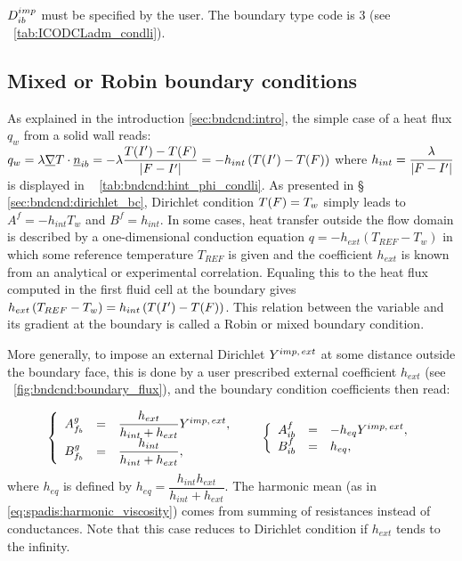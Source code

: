 \begin{remark}
$D^{imp}_{ib}$ must be specified by the user. The boundary type code is $3$ (see \tablename~\ref{tab:ICODCLadm_condli}).
\end{remark}

\subsection{Mixed or Robin boundary conditions}
As explained in the introduction \ref{sec:bndcnd:intro}, the simple case of a heat flux $q_w$ from a solid wall reads: $q_w = \lambda \underline{\nabla} T \cdot \underline{n}_{ib} = - \lambda \dfrac{T({I^\prime}) - T(F)}{\left| F - {I^\prime} \right|} = -h_{int} \left( T({I^\prime}) - T(F) \right)$ where $h_{int} = \dfrac{\lambda}{\left| F - {I^\prime} \right|}$ is displayed in \tablename~ \ref{tab:bndcnd:hint_phi_condli}.
As presented in \S~ \ref{sec:bndcnd:dirichlet_bc}, Dirichlet condition $T(F) = T_w$ simply leads to $A^f = - h_{int} T_w$ and $B^f = h_{int}$.
In some cases, heat transfer outside the flow domain is described by a one-dimensional conduction equation $q = -h_{ext} \left(T_{REF} - T_w \right)$
in which some reference temperature $T_{REF}$ is given and the coefficient $h_{ext}$ is known from an analytical or experimental correlation.
Equaling this to the heat flux computed in the first fluid cell at the boundary gives $ h_{ext} \left(T_{REF} - T_w \right) = h_{int} \left( T({I^\prime}) - T(F) \right)$. This relation between the variable and its gradient at the boundary is called a Robin or mixed boundary condition.

More generally, to impose an external Dirichlet $Y^{imp, \, ext}$ at some distance outside the boundary face,
this is done by a user prescribed external coefficient $h_{ext}$
(see \figurename~\ref{fig:bndcnd:boundary_flux}), and the boundary condition coefficients then read:

\begin{equation}
\begin{array}{r c l}
\left\lbrace
\begin{array}{r c l}
A^g_{f_{b}} & = &\dfrac{h_{ext}}{h_{int}+h_{ext}} Y^{imp, \, ext}, \\
B^g_{f_{b}} & = & \dfrac{h_{int}}{h_{int}+h_{ext}} ,
\end{array}
\right.
& &
\left\lbrace
\begin{array}{r c l}
A^f_{ib} & = & -h_{eq} Y^{imp, \, ext} , \\
B^f_{ib} & = & h_{eq},
\end{array}
\right.
\end{array}
\end{equation}
where $h_{eq} $ is defined by $h_{eq}=\dfrac{h_{int} h_{ext}}{ h_{int} + h_{ext}}$.
The harmonic mean (as in \eqref{eq:spadis:harmonic_viscosity}) comes from summing of resistances instead of conductances.
Note that this case reduces to Dirichlet condition if $h_{ext}$ tends to the infinity.

